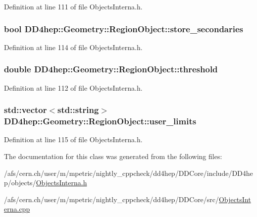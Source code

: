 Definition at line 111 of file ObjectsInterna.h.\hypertarget{class_d_d4hep_1_1_geometry_1_1_region_object_a531d5176989429dfcb6c6cce094ee209}{
\subsubsection[{store\_\-secondaries}]{\setlength{\rightskip}{0pt plus 5cm}bool {\bf DD4hep::Geometry::RegionObject::store\_\-secondaries}}}
\label{class_d_d4hep_1_1_geometry_1_1_region_object_a531d5176989429dfcb6c6cce094ee209}


Definition at line 114 of file ObjectsInterna.h.\hypertarget{class_d_d4hep_1_1_geometry_1_1_region_object_a62b96102392556bd53f18a440dff1483}{
\subsubsection[{threshold}]{\setlength{\rightskip}{0pt plus 5cm}double {\bf DD4hep::Geometry::RegionObject::threshold}}}
\label{class_d_d4hep_1_1_geometry_1_1_region_object_a62b96102392556bd53f18a440dff1483}


Definition at line 112 of file ObjectsInterna.h.\hypertarget{class_d_d4hep_1_1_geometry_1_1_region_object_a6d6a6cffbfc5b1937b3b1c46e2580430}{
\subsubsection[{user\_\-limits}]{\setlength{\rightskip}{0pt plus 5cm}std::vector$<$std::string$>$ {\bf DD4hep::Geometry::RegionObject::user\_\-limits}}}
\label{class_d_d4hep_1_1_geometry_1_1_region_object_a6d6a6cffbfc5b1937b3b1c46e2580430}


Definition at line 115 of file ObjectsInterna.h.

The documentation for this class was generated from the following files:\begin{DoxyCompactItemize}
\item 
/afs/cern.ch/user/m/mpetric/nightly\_\-cppcheck/dd4hep/DDCore/include/DD4hep/objects/\hyperlink{_objects_interna_8h}{ObjectsInterna.h}\item 
/afs/cern.ch/user/m/mpetric/nightly\_\-cppcheck/dd4hep/DDCore/src/\hyperlink{_objects_interna_8cpp}{ObjectsInterna.cpp}\end{DoxyCompactItemize}
